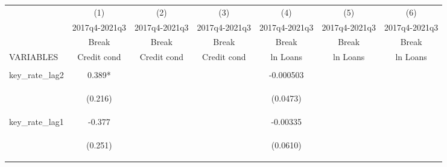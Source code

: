 



\begin{tabular}{lcccccc} \hline
 & (1) & (2) & (3) & (4) & (5) & (6) \\
 & 2017q4-2021q3 & 2017q4-2021q3 & 2017q4-2021q3 & 2017q4-2021q3 & 2017q4-2021q3 & 2017q4-2021q3 \\
 & Break & Break & Break & Break & Break & Break \\
VARIABLES & Credit cond & Credit cond & Credit cond & ln Loans & ln Loans & ln Loans \\ \hline
\vspace{4pt} & \begin{footnotesize}\end{footnotesize} & \begin{footnotesize}\end{footnotesize} & \begin{footnotesize}\end{footnotesize} & \begin{footnotesize}\end{footnotesize} & \begin{footnotesize}\end{footnotesize} & \begin{footnotesize}\end{footnotesize} \\
key\_rate\_lag2 & 0.389* &  &  & -0.000503 &  &  \\
\vspace{4pt} & \begin{footnotesize}(0.216)\end{footnotesize} & \begin{footnotesize}\end{footnotesize} & \begin{footnotesize}\end{footnotesize} & \begin{footnotesize}(0.0473)\end{footnotesize} & \begin{footnotesize}\end{footnotesize} & \begin{footnotesize}\end{footnotesize} \\
key\_rate\_lag1 & -0.377 &  &  & -0.00335 &  &  \\
\vspace{4pt} & \begin{footnotesize}(0.251)\end{footnotesize} & \begin{footnotesize}\end{footnotesize} & \begin{footnotesize}\end{footnotesize} & \begin{footnotesize}(0.0610)\end{footnotesize} & \begin{footnotesize}\end{footnotesize} & \begin{footnotesize}\end{footnotesize} \\

\end{tabular}
